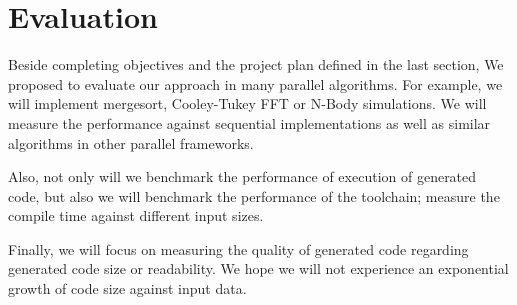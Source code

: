 \chapter{Evaluation}
Beside completing objectives and the project plan defined in the last section, We proposed to evaluate our approach in many parallel algorithms. For example, we will implement mergesort, Cooley-Tukey FFT or N-Body simulations. We will measure the performance against sequential implementations as well as similar algorithms in other parallel frameworks. 

Also, not only will we benchmark the performance of execution of generated code, but also we will benchmark the performance of the toolchain; \eg measure the compile time against different input sizes. 

Finally, we will focus on measuring the quality of generated code regarding generated code size or readability. We hope we will not experience an exponential growth of code size against input data.